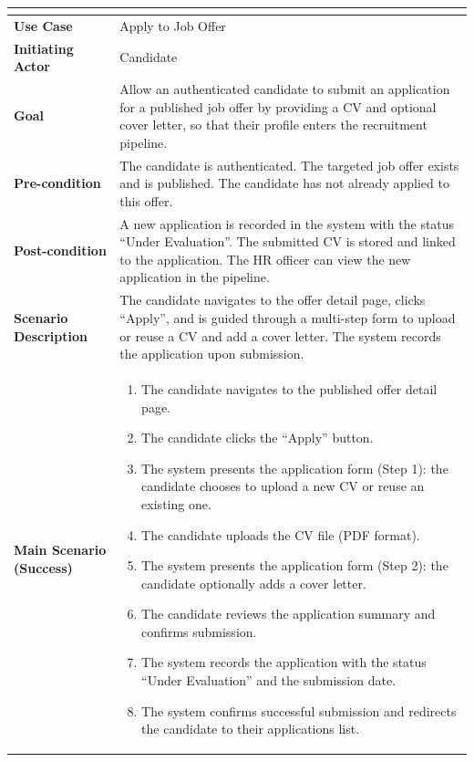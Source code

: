 \setlength{\tabcolsep}{4pt}
\renewcommand{\arraystretch}{1.1}
\begin{table}[H]
\centering
\small
\begin{tabularx}{\textwidth}{|>{\bfseries\arraybackslash}p{4cm}|X|}
\hline
\rowcolor{headerblue}
\multicolumn{2}{|c|}{\textbf{Use Case: Apply to Job Offer}} \\
\hline
Use Case            & Apply to Job Offer \\
\hline
Initiating Actor    & Candidate \\
\hline
Goal                & Allow an authenticated candidate to submit an application for a published job offer by providing a CV and optional cover letter, so that their profile enters the recruitment pipeline. \\
\hline
Pre-condition       & The candidate is authenticated. The targeted job offer exists and is published. The candidate has not already applied to this offer. \\
\hline
Post-condition      & A new application is recorded in the system with the status ``Under Evaluation''. The submitted CV is stored and linked to the application. The HR officer can view the new application in the pipeline. \\
\hline
Scenario Description &
The candidate navigates to the offer detail page, clicks ``Apply'', and is guided through a multi-step form to upload or reuse a CV and add a cover letter. The system records the application upon submission. \\
\hline
Main Scenario (Success) &
\begin{enumerate}[leftmargin=*, label=\arabic*., topsep=0pt, itemsep=0pt]
    \item The candidate navigates to the published offer detail page.
    \item The candidate clicks the ``Apply'' button.
    \item The system presents the application form (Step 1): the candidate chooses to upload a new CV or reuse an existing one.
    \item The candidate uploads the CV file (PDF format).
    \item The system presents the application form (Step 2): the candidate optionally adds a cover letter.
    \item The candidate reviews the application summary and confirms submission.
    \item The system records the application with the status ``Under Evaluation'' and the submission date.
    \item The system confirms successful submission and redirects the candidate to their applications list.

\end{enumerate}
\end{tabularx}
\end{table}
